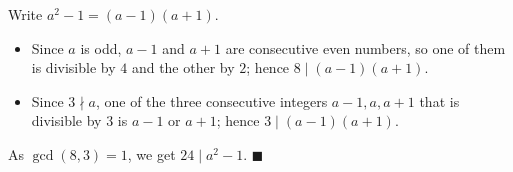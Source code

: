 Write $a^2-1=(a-1)(a+1)$.
\begin{itemize}
\item Since $a$ is odd, $a-1$ and $a+1$ are consecutive even numbers, so one of them is divisible by $4$ and the other by $2$; hence $8\mid(a-1)(a+1)$.
\item Since $3\nmid a$, one of the three consecutive integers $a-1,a,a+1$ that is divisible by $3$ is $a-1$ or $a+1$; hence $3\mid(a-1)(a+1)$.
\end{itemize}
As $\gcd(8,3)=1$, we get $24\mid a^2-1$. $\blacksquare$
